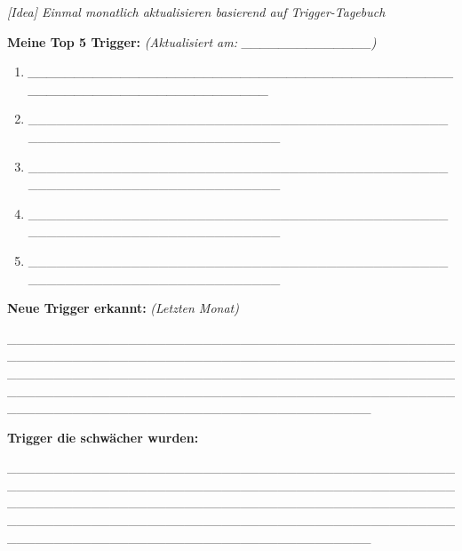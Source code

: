 \emph{[Idea] Einmal monatlich aktualisieren basierend auf Trigger-Tagebuch}

\textbf{Meine Top 5 Trigger:} \emph{(Aktualisiert am: \_\_\_\_\_\_\_\_\_\_\_\_\_\_)}

\begin{enumerate}
\def\labelenumi{\arabic{enumi}.}
\item
  \emph{\_\_\_\_\_\_\_\_\_\_\_\_\_\_\_\_\_\_\_\_\_\_\_\_\_\_\_\_\_\_\_\_\_\_\_\_\_\_\_\_\_\_\_\_\_\_\_\_\_\_\_\_\_\_\_\_\_\_\_\_\_\_\_\_\_\_\_\_\_\_\_\_}
\item
  \_\_\_\_\_\_\_\_\_\_\_\_\_\_\_\_\_\_\_\_\_\_\_\_\_\_\_\_\_\_\_\_\_\_\_\_\_\_\_\_\_\_\_\_\_\_\_\_\_\_\_\_\_\_\_\_\_\_\_\_\_\_\_\_\_\_\_\_\_\_\_\_
\item
  \_\_\_\_\_\_\_\_\_\_\_\_\_\_\_\_\_\_\_\_\_\_\_\_\_\_\_\_\_\_\_\_\_\_\_\_\_\_\_\_\_\_\_\_\_\_\_\_\_\_\_\_\_\_\_\_\_\_\_\_\_\_\_\_\_\_\_\_\_\_\_\_
\item
  \_\_\_\_\_\_\_\_\_\_\_\_\_\_\_\_\_\_\_\_\_\_\_\_\_\_\_\_\_\_\_\_\_\_\_\_\_\_\_\_\_\_\_\_\_\_\_\_\_\_\_\_\_\_\_\_\_\_\_\_\_\_\_\_\_\_\_\_\_\_\_\_
\item
  \_\_\_\_\_\_\_\_\_\_\_\_\_\_\_\_\_\_\_\_\_\_\_\_\_\_\_\_\_\_\_\_\_\_\_\_\_\_\_\_\_\_\_\_\_\_\_\_\_\_\_\_\_\_\_\_\_\_\_\_\_\_\_\_\_\_\_\_\_\_\_\_
\end{enumerate}

\textbf{Neue Trigger erkannt:} \emph{(Letzten Monat)}

\_\_\_\_\_\_\_\_\_\_\_\_\_\_\_\_\_\_\_\_\_\_\_\_\_\_\_\_\_\_\_\_\_\_\_\_\_\_\_\_\_\_\_\_\_\_\_\_\_\_\_\_\_\_\_\_\_\_\_\_\_\_\_\_\_\_\_\_\_\_\_\_\_\_\_\_\_\_\_\_\_\_\_\_\_\_\_\_\_\_\_\_\_\_\_\_\_\_\_\_\_\_\_\_\_\_\_\_\_\_\_\_\_\_\_\_\_\_\_\_\_\_\_\_\_\_\_\_\_\_\_\_\_\_\_\_\_\_\_\_\_\_\_\_\_\_\_\_\_\_\_\_\_\_\_\_\_\_\_\_\_\_\_\_\_\_\_\_\_\_\_\_\_\_\_\_\_\_\_\_\_\_\_\_\_\_\_\_\_\_\_\_\_\_\_\_\_\_\_\_\_\_\_\_\_\_\_\_\_\_\_\_\_\_\_\_\_\_\_\_\_\_\_\_\_\_\_\_\_\_\_

\textbf{Trigger die schwächer wurden:}

\_\_\_\_\_\_\_\_\_\_\_\_\_\_\_\_\_\_\_\_\_\_\_\_\_\_\_\_\_\_\_\_\_\_\_\_\_\_\_\_\_\_\_\_\_\_\_\_\_\_\_\_\_\_\_\_\_\_\_\_\_\_\_\_\_\_\_\_\_\_\_\_\_\_\_\_\_\_\_\_\_\_\_\_\_\_\_\_\_\_\_\_\_\_\_\_\_\_\_\_\_\_\_\_\_\_\_\_\_\_\_\_\_\_\_\_\_\_\_\_\_\_\_\_\_\_\_\_\_\_\_\_\_\_\_\_\_\_\_\_\_\_\_\_\_\_\_\_\_\_\_\_\_\_\_\_\_\_\_\_\_\_\_\_\_\_\_\_\_\_\_\_\_\_\_\_\_\_\_\_\_\_\_\_\_\_\_\_\_\_\_\_\_\_\_\_\_\_\_\_\_\_\_\_\_\_\_\_\_\_\_\_\_\_\_\_\_\_\_\_\_\_\_\_\_\_\_\_\_\_\_

\hypertarget{section-1}{%
\subsection{}\label{section-1}}

